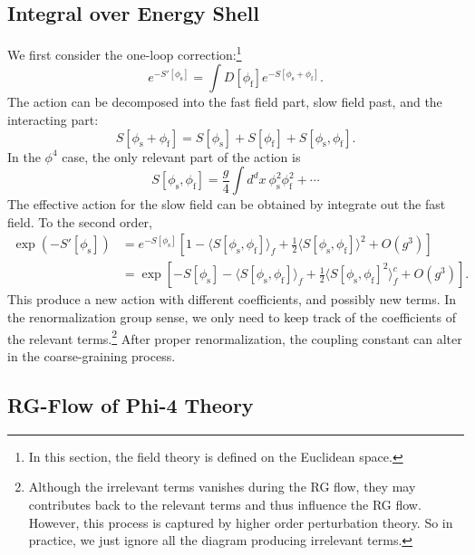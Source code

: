 \documentclass[aps,prb,superscriptaddress,nofootinbib]{revtex4}
\begin{document}
\subsection{Integral over Energy Shell}

We first consider the one-loop correction:\footnote{In this section, the field theory is defined on the Euclidean space.}
\begin{equation}
	e^{-S'[\phi_{\mathrm{s}}]} = \int D[\phi_{\mathrm{f}}] e^{-S[\phi_{\mathrm{s}}+\phi_{\mathrm{f}}]}.
\end{equation} 
The action can be decomposed into the fast field part, slow field past, and the interacting part:
\begin{equation}
	S[\phi_{\mathrm{s}}+\phi_{\mathrm{f}}] = S[\phi_{\mathrm{s}}] + S[\phi_{\mathrm{f}}] + S[\phi_{\mathrm{s}}, \phi_{\mathrm{f}}].
\end{equation}
In the $\phi^4$ case, the only relevant part of the action is
\begin{equation}
	S[\phi_{\mathrm{s}},\phi_{\mathrm{f}}] = \frac{g}{4} \int d^d x\ \phi_{\mathrm{s}}^2 \phi_{\mathrm{f}}^2 + \cdots
\end{equation}
The effective action for the slow field can be obtained by integrate out the fast field.
To the second order,
\begin{equation}
\begin{aligned}
	\exp\left(-S'[\phi_{\mathrm{s}}]\right) 
	&= e^{-S[\phi_{\mathrm{s}}]} \left[1-\langle S[\phi_{\mathrm{s}},\phi_{\mathrm{f}}]\rangle_f + \frac{1}{2} \langle S[\phi_{\mathrm{s}},\phi_{\mathrm{f}}]\rangle^2+O(g^3) \right]\\
	&= \exp\left[-S[\phi_{\mathrm{s}}]-\langle S[\phi_{\mathrm{s}},\phi_{\mathrm{f}}]\rangle_f + \frac{1}{2}\langle S[\phi_{\mathrm{s}},\phi_{\mathrm{f}}]^2\rangle^c_f +O(g^3)\right].
\end{aligned}
\end{equation}
This produce a new action with different coefficients, and possibly new terms.
In the renormalization group sense, we only need to keep track of the coefficients of the relevant terms.\footnote{Although the irrelevant terms vanishes during the RG flow, they may contributes back to the relevant terms and thus influence the RG flow. However, this process is captured by higher order perturbation theory. So in practice, we just ignore all the diagram producing irrelevant terms.}
After proper renormalization, the coupling constant can alter in the coarse-graining process.


\subsection{RG-Flow of Phi-4 Theory}
\end{document}
